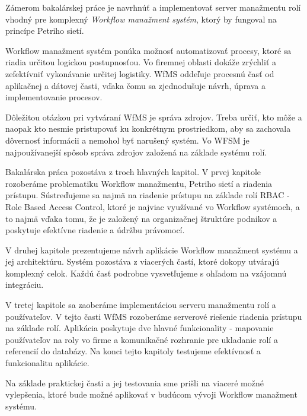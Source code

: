 Zámerom bakalárskej práce je navrhnúť a implementovať server manažmentu rolí vhodný pre komplexný \emph{Workflow manažment systém}, ktorý by fungoval na princípe Petriho sietí.

Workflow manažment systém ponúka možnosť automatizovať procesy, ktoré sa riadia určitou logickou postupnosťou. Vo firemnej oblasti dokáže zrýchliť a zefektívniť vykonávanie určitej logistiky. WfMS oddeľuje procesnú časť od aplikačnej a dátovej časti, vďaka čomu sa zjednodušuje návrh, úprava a implementovanie procesov.

Dôležitou otázkou pri vytváraní WfMS je správa zdrojov.
Treba určiť, kto môže a naopak kto nesmie pristupovať ku konkrétnym prostriedkom,
aby sa zachovala dôvernosť informácii a nemohol byť narušený systém. Vo WFSM je
najpoužívanejší spôsob správa zdrojov založená na základe systému rolí.
 
Bakalárska práca pozostáva z troch hlavných kapitol. V prvej kapitole rozoberáme problematiku Workflow manažmentu, Petriho sietí a riadenia prístupu. Sústreďujeme sa najmä na riadenie prístupu na základe rolí RBAC - Role Based Access Control, ktoré je najviac využívané vo Workflow systémoch, a to najmä vďaka tomu, že je založený na
organizačnej štruktúre podnikov a poskytuje efektívne riadenie a údržbu právomocí. 

V druhej kapitole prezentujeme návrh aplikácie Workflow  manažment systému a jej architektúru. Systém pozostáva z viacerých častí, ktoré dokopy utvárajú komplexný celok. Každú časť podrobne vysvetľujeme s ohľadom na vzájomnú integráciu.

V tretej kapitole sa zaoberáme  implementáciou serveru manažmentu rolí a používateľov. V tejto časti WfMS rozoberáme serverové riešenie riadenia prístupu na základe rolí. Aplikácia poskytuje dve hlavné funkcionality - mapovanie používateľov na roly vo firme a komunikačné rozhranie pre ukladanie rolí a referencií do databázy. Na konci tejto kapitoly testujeme efektívnosť a funkcionalitu aplikácie.

Na základe praktickej časti a jej testovania sme prišli na viaceré možné vylepšenia, ktoré bude možné aplikovať v budúcom vývoji Workflow manažment systému. 




 




















